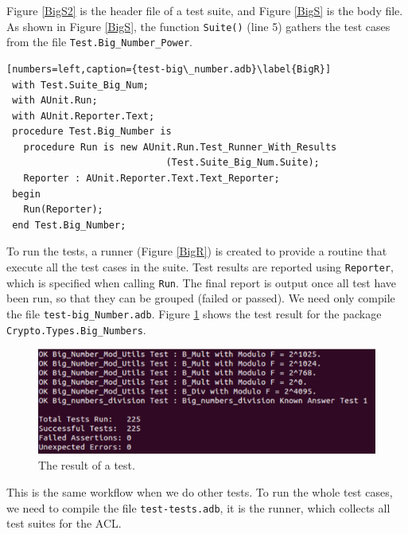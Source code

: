 Figure \ref{BigS2} is the header file of a test suite, and Figure
\ref{BigS} is the body file. As shown in Figure \ref{BigS}, the
function \texttt{Suite()} (line 5) gathers the test cases from the
file \texttt{Test.Big\_Number\_Power}.

\begin{lstlisting}[numbers=left,caption={test-big\_number.adb}\label{BigR}]
 with Test.Suite_Big_Num;
 with AUnit.Run;
 with AUnit.Reporter.Text;
 procedure Test.Big_Number is
   procedure Run is new AUnit.Run.Test_Runner_With_Results
   							(Test.Suite_Big_Num.Suite);
   Reporter : AUnit.Reporter.Text.Text_Reporter;
 begin
   Run(Reporter);
 end Test.Big_Number;
\end{lstlisting}

To run the tests, a runner (Figure \ref{BigR}) is created to provide a
routine that execute all the test cases in the suite. Test results are
reported using \texttt{Reporter}, which is specified when calling
\texttt{Run}. The final report is output once all test have been run,
so that they can be grouped (failed or passed).  We need only compile
the file \texttt{test-big\_Number.adb}.  Figure \ref{TEST} shows the
test result for the package \texttt{Crypto.Types.Big\_Numbers}.
\begin{figure}[h]
\centering
  \includegraphics[scale=0.5]{./images/Big_Number}
  \caption{The result of a test.}\label{TEST}
\end{figure}

This is the same workflow when we do other tests. To run the whole
test cases, we need to compile the file \texttt{test-tests.adb}, it is
the runner, which collects all test suites for the ACL.

